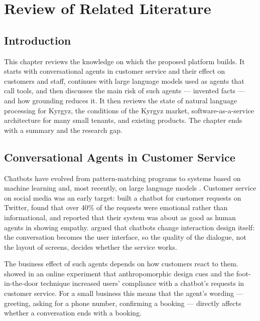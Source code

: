 
\chapter{Review of Related Literature} %

\label{Chapter2}


\section{Introduction}

This chapter reviews the knowledge on which the proposed platform builds. It starts with conversational agents in
customer service and their effect on customers and staff, continues with large language models used as agents that call
tools, and then discusses the main risk of such agents --- invented facts --- and how grounding reduces it. It then
reviews the state of natural language processing for Kyrgyz, the conditions of the Kyrgyz market, software-as-a-service
architecture for many small tenants, and existing products. The chapter ends with a summary and the research gap.

\section{Conversational Agents in Customer Service}

Chatbots have evolved from pattern-matching programs to systems based on machine learning and, most recently, on large
language models \parencite{adamopoulou2020chatbots}. Customer service on social media was an early target:
\textcite{xu2017new} built a chatbot for customer requests on Twitter, found that over 40\% of the requests were
emotional rather than informational, and reported that their system was about as good as human agents in showing empathy.
\textcite{folstad2017chatbots} argued that chatbots change interaction design itself: the conversation becomes the user
interface, so the quality of the dialogue, not the layout of screens, decides whether the service works.

The business effect of such agents depends on how customers react to them. \textcite{adam2021ai} showed in an online
experiment that anthropomorphic design cues and the foot-in-the-door technique increased users' compliance with a
chatbot's requests in customer service. For a small business this means that the agent's wording --- greeting, asking
for a phone number, confirming a booking --- directly affects whether a conversation ends with a booking.

